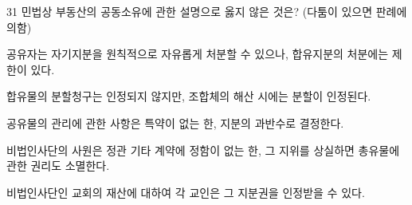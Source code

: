 \begin{question}{31}
민법상 부동산의 공동소유에 관한 설명으로 옳지 않은 것은? (다툼이 있으면 판례에 의함)
\begin{choices}
  \item 공유자는 자기지분을 원칙적으로 자유롭게 처분할 수 있으나, 합유지분의 처분에는 제한이 있다.
  \item 합유물의 분할청구는 인정되지 않지만, 조합체의 해산 시에는 분할이 인정된다.
  \item 공유물의 관리에 관한 사항은 특약이 없는 한, 지분의 과반수로 결정한다.
  \item 비법인사단의 사원은 정관 기타 계약에 정함이 없는 한, 그 지위를 상실하면 총유물에 관한 권리도 소멸한다.
  \item 비법인사단인 교회의 재산에 대하여 각 교인은 그 지분권을 인정받을 수 있다.
\end{choices}
\end{question}
